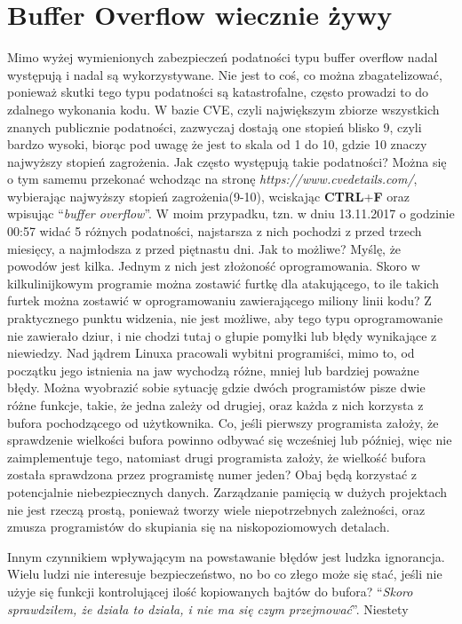 \documentclass[polish]{kbk}
\begin{document}
\section{Buffer Overflow wiecznie żywy}
Mimo wyżej wymienionych zabezpieczeń podatności typu buffer overflow nadal 
występują i nadal są wykorzystywane. Nie jest to coś, co można zbagatelizować, 
ponieważ skutki tego typu podatności są katastrofalne, często prowadzi to do 
zdalnego wykonania kodu. W bazie CVE, czyli największym zbiorze wszystkich
znanych publicznie podatności, zazwyczaj dostają one stopień 
blisko 9, czyli bardzo wysoki, biorąc pod uwagę że jest to skala od 1 do 10,
gdzie 10 znaczy najwyższy stopień zagrożenia. 
Jak często występują takie podatności? Można się o tym samemu przekonać 
wchodząc na stronę \emph{https://www.cvedetails.com/}, wybierając najwyższy 
stopień zagrożenia(9-10), wciskając \textbf{CTRL}+\textbf{F} oraz wpisując 
``\emph{buffer overflow}''. W moim przypadku, tzn. w dniu 13.11.2017 o godzinie 
00:57 widać 5 różnych podatności, najstarsza z nich pochodzi z przed trzech 
miesięcy, a najmłodsza z przed piętnastu dni. Jak to możliwe? Myślę, że powodów 
jest kilka. Jednym z nich jest złożoność oprogramowania. Skoro w kilkulinijkowym 
programie można zostawić furtkę dla atakującego, to ile takich furtek można 
zostawić w oprogramowaniu zawierającego miliony linii kodu? Z praktycznego punktu 
widzenia, nie jest możliwe, aby tego typu oprogramowanie nie zawierało dziur, i 
nie chodzi tutaj o głupie pomyłki lub błędy wynikające z niewiedzy. Nad jądrem 
Linuxa pracowali wybitni programiści, mimo to, od początku jego istnienia na 
jaw wychodzą różne, mniej lub bardziej poważne błędy. Można wyobrazić sobie sytuację 
gdzie dwóch programistów pisze dwie różne funkcje, takie, że jedna zależy od 
drugiej, oraz każda z nich korzysta z bufora pochodzącego od użytkownika. Co, 
jeśli pierwszy programista założy, że sprawdzenie wielkości bufora powinno odbywać 
się wcześniej lub później, więc nie zaimplementuje tego, natomiast drugi programista 
założy, że wielkość bufora została sprawdzona przez programistę numer jeden? Obaj 
będą korzystać z potencjalnie niebezpiecznych danych. Zarządzanie pamięcią w 
dużych projektach nie jest rzeczą prostą, ponieważ tworzy wiele niepotrzebnych 
zależności, oraz zmusza programistów do skupiania się na niskopoziomowych detalach.
\par
Innym czynnikiem wpływającym na powstawanie błędów jest ludzka ignorancja. Wielu 
ludzi nie interesuje bezpieczeństwo, no bo co złego może się stać, jeśli nie 
użyje się funkcji kontrolującej ilość kopiowanych bajtów do bufora? ``\emph{Skoro 
sprawdziłem, że działa to działa, i nie ma się czym przejmować}''. Niestety 
\end{document}
